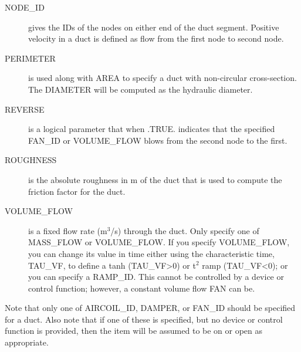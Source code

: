 \documentclass[11pt]{book}
\begin{document}
\begin{description}
\item[{\ct NODE\_ID}] gives the {\ct ID}s of the nodes on either end of the duct segment.  Positive velocity in a duct is defined as flow from the first node to second node.
\item[{\ct PERIMETER}] is used along with {\ct AREA} to specify a duct with non-circular cross-section.  The {\ct DIAMETER} will be computed as the hydraulic diameter.
\item[{\ct REVERSE}]  is a logical parameter that when {\ct .TRUE.} indicates that the specified {\ct FAN\_ID} or {\ct VOLUME\_FLOW} blows from the second node to the first.
\item[{\ct ROUGHNESS}] is the absolute roughness in m of the duct that is used to compute the friction factor for the duct.
\item[{\ct VOLUME\_FLOW}] is a fixed flow rate (m$^3$/s) through the duct.  Only specify one of {\ct MASS\_FLOW} or {\ct VOLUME\_FLOW}. If you specify {\ct VOLUME\_FLOW}, you can change its value in time either using the characteristic time, {\ct TAU\_VF},  to define a tanh ({\ct TAU\_VF}>0) or t$^2$ ramp ({\ct TAU\_VF}<0); or you can specify a {\ct RAMP\_ID}.  This cannot be controlled by a device or control function; however, a constant volume flow {\ct FAN} can be.
\end{description}
Note that only one of {\ct AIRCOIL\_ID}, {\ct DAMPER}, or {\ct FAN\_ID} should be specified for a duct.  Also note that if one of these is specified, but no device or control function is provided, then the item will be assumed to be on or open as appropriate.
\end{document}

